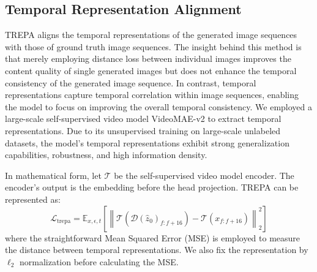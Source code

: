 \subsection{Temporal Representation Alignment}
\label{sec:trepa}
TREPA aligns the temporal representations of the generated image sequences with those of ground truth image sequences. The insight behind this method is that merely employing distance loss between individual images improves the content quality of single generated images but does not enhance the temporal consistency of the generated image sequence. In contrast, temporal representations capture temporal correlation within image sequences, enabling the model to focus on improving the overall temporal consistency. We employed a large-scale self-supervised video model VideoMAE-v2 \cite{wang2023videomae} to extract temporal representations. Due to its unsupervised training on large-scale unlabeled datasets, the model's temporal representations exhibit strong generalization capabilities, robustness, and high information density.

In mathematical form, let $\mathcal{T}$ be the self-supervised video model encoder. The encoder's output is the embedding before the head projection. TREPA can be represented as:
\begin{equation}
    \mathcal{L}_{\text{trepa}} = \mathbb{E}_{x, \epsilon, t} \left[ \left\| \mathcal{T}(\mathcal{D}(\hat{z}_0)_{f:f+16}) - \mathcal{T}(x_{f:f+16}) \right\|_2^2 \right]
    \label{eq:trepa}
\end{equation}
where the straightforward Mean Squared Error (MSE) is employed to measure the distance between temporal representations. We also fix the representation by $\ell_2$ normalization before calculating the MSE.


